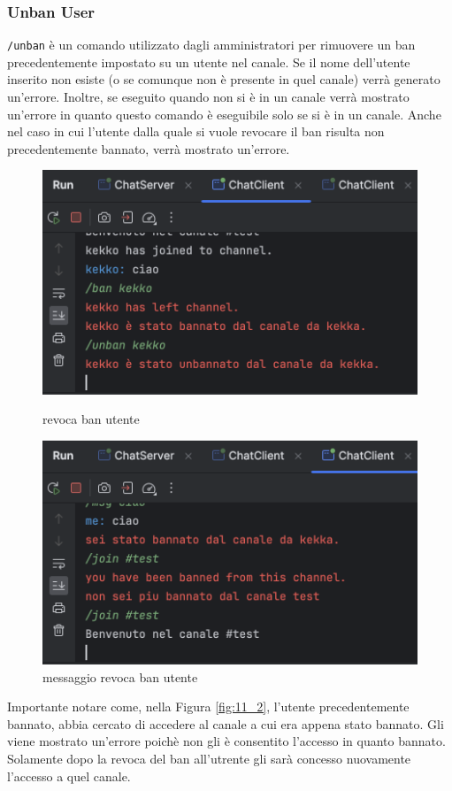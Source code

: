 \subsubsection{Unban User}
\item \texttt{/unban} è un comando utilizzato dagli amministratori per rimuovere un ban precedentemente impostato su un utente nel canale. Se il nome dell'utente inserito non esiste (o se comunque non è presente in quel canale) verrà generato un'errore. Inoltre, se eseguito quando non si è in un canale verrà mostrato un'errore in quanto questo comando è eseguibile solo se si è in un canale. Anche nel caso in cui l'utente dalla quale si vuole revocare il ban risulta non precedentemente bannato, verrà mostrato un'errore.
\begin{figure}[h]
  \centering
  \begin{minipage}{0.45\textwidth}
    \includegraphics[width=\linewidth]{imagens/outputs/11.png}
    \caption{revoca ban utente}
  \end{minipage}\hfill
  \begin{minipage}{0.45\textwidth}
    \includegraphics[width=\linewidth]{imagens/outputs/11_2.png}
    \caption{messaggio revoca ban utente}
  \end{minipage}\hfill
\end{figure}
\newline
Importante notare come, nella Figura \ref{fig:11_2}, l'utente precedentemente bannato, abbia cercato di accedere al canale a cui era appena stato bannato. Gli viene mostrato un'errore poichè non gli è consentito l'accesso in quanto bannato. Solamente dopo la revoca del ban all'utrente gli sarà concesso nuovamente l'accesso a quel canale.

